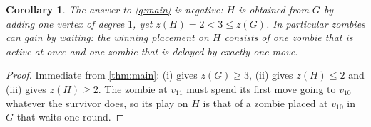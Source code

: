 \documentclass[11pt,a4paper]{article}
\theoremstyle{plain}
\newtheorem{corollary}[theorem]{Corollary}
\theoremstyle{definition}
\theoremstyle{remark}
\begin{document}
\begin{corollary}\label{cor:main}
The answer to \cref{q:main} is negative: $H$ is obtained from $G$ by adding one vertex of degree $1$, yet $z(H)=2<3\le z(G)$. In particular zombies can gain by waiting: the winning placement on $H$ consists of one zombie that is active at once and one zombie that is delayed by exactly one move.
\end{corollary}

\begin{proof}
Immediate from \cref{thm:main}: (i) gives $z(G)\ge3$, (ii) gives $z(H)\le2$ and (iii) gives $z(H)\ge2$. The zombie at $v_{11}$ must spend its first move going to $v_{10}$ whatever the survivor does, so its play on $H$ is that of a zombie placed at $v_{10}$ in $G$ that waits one round.
\end{proof}
\end{document}
